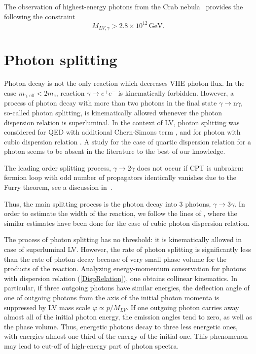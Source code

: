 \documentclass{webofc}
\newcommand{\be}{\begin{equation}}
\newcommand{\ee}{\end{equation}}
\begin{document}
The observation of highest-energy photons  from
the Crab nebula~\cite{Martinez-Huerta:2016azo} provides the following the constraint
\be
\label{decayrecent}
M_{LV,\gamma} > 2.8\times 10^{12}\,\mbox{GeV}.
\ee




\section{Photon splitting} 
\label{The photon splitting}
Photon decay is not the only reaction which decreases VHE photon flux. 
In the case $m_{\gamma,\mathrm{eff}} < 2m_{e}$, reaction $\gamma \to e^+e^-$ is kinematically forbidden. However, a process of photon decay with more than two photons in the final state $\gamma \to \mbox{n}\gamma$, so-called photon splitting, is kinematically allowed whenever the photon dispersion relation is superluminal. In the context of LV, photon splitting was considered for QED with additional Chern-Simons term \cite{Adam:2002rg}, and for photon with cubic dispersion relation \cite{Gelmini:2005gy}. A study for the case of quartic dispersion relation for a photon seems to be absent in the literature to the best of our knowledge. 

The leading order splitting process, $\gamma \to 2 \gamma$ does not occur if CPT is unbroken: fermion loop with odd number of propagators identically vanishes due to the Furry theorem, see a discussion   in~\cite{Liberati:2013xla}.

Thus, the main  splitting process is the photon decay into 3 photons,  $\gamma \to 3\gamma$. In order to estimate the width of the reaction, we follow the lines of  \cite{Gelmini:2005gy}, where the similar estimates have been done for the case of cubic photon dispersion relation.

The process of photon splitting has no threshold: it is kinematically allowed in case of superluminal LV. However, the rate of photon splitting is significantly less than the rate of photon decay because of very small phase volume for the products of the reaction. Analyzing energy-momentum conservation for photons with dispersion relation (\ref{DispRelation}), one obtains collinear kinematics. In particular, if three outgoing photons have similar energies, the deflection angle of one of outgoing photons from the axis of the initial photon momenta  is suppressed by LV mass scale $\varphi \propto p/M_{LV}$. If one outgoing photon carries away almost all of the initial photon energy, the emission angles tend to zero, as well as the phase volume. Thus, energetic photons decay to three less energetic ones, with energies almost one third of the energy of the initial one. This phenomenon may lead to cut-off of high-energy part of photon spectra. 
\end{document}
